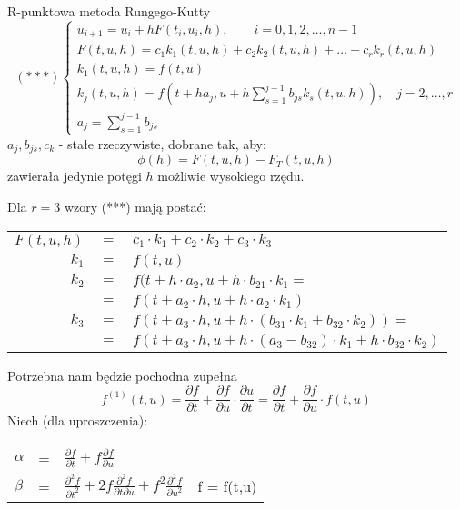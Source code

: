 \begin{frame}{R-punktowa metoda Rungego-Kutty}
	$$(***)\left\{\begin{array}{l}
	u_{i+1} = u_i + h F(t_i,u_i,h), \qquad i = 0,1,2,\ldots,n-1\\
    F(t,u,h) = c_1k_1(t,u,h) + c_2k_2(t,u,h)+\ldots+c_rk_r(t,u,h)\\
    k_1(t,u,h) = f(t,u) \\
    k_j(t,u,h) = f(t+ha_j,u+h \sum_{s=1}^{j-1}b_{js}k_s(t,u,h)), \quad j = 2,\ldots,r \\
    a_j = \sum_{s=1}^{j-1}b_{js}
	\end{array}\right.$$
    $a_j, b_{js}, c_k$ - stałe rzeczywiste, dobrane tak, aby:
    $$\phi(h) = F(t,u,h) - F_T(t,u,h)$$
    zawierała jedynie potęgi $h$ możliwie wysokiego rzędu. 	
\end{frame}
\begin{frame}
    Dla $r = 3$ wzory (***) mają postać:
   	\newline
    \begin{tabular}{rcl}
    	$F(t,u,h)$ & $=$ & $c_1 \cdot k_1 + c_2 \cdot k_2 + c_3 \cdot k_3$ \\
        $k_1$ & $=$ & $f(t,u)$ \\
        $k_2$ & $=$ & $f(t + h \cdot a_2, u + h \cdot b_{21} \cdot k_1 =$ \\
         & $=$ & $f(t+a_2 \cdot h, u+h \cdot a_2 \cdot k_1) $\\
        $k_3$ & $=$ & $f(t+a_3 \cdot h, u+h \cdot (b_{31} \cdot k_1 + b_{32} \cdot k_2)) = $ \\
         & $=$ & $f(t+a_3 \cdot h, u+h \cdot (a_3 - b_{32}) \cdot k_1 + h \cdot b_{32} \cdot k_2)$
    \end{tabular}
    Potrzebna nam będzie pochodna zupełna
    $$f^{(1)}(t,u) = \frac{\partial f}{\partial t}+\frac{\partial f}{\partial u} \cdot \frac{\partial u}{\partial t}=\frac{\partial f}{\partial t}+ 
    \frac{\partial f}{\partial u} \cdot f(t,u)$$
    	Niech (dla uproszczenia):
    \begin{tabular}{lcll}
    $\alpha$ & = & $\frac{\partial f}{\partial t}+f\frac{\partial f}{\partial u}$ & \\
    $\beta$ & = & $\frac{\partial^2f}{\partial t^2}+2f\frac{\partial^2f}{\partial t \partial u}+f^2\frac{\partial^2f}{\partial u^2}$ & f = f(t,u)
    \end{tabular}
\end{frame}
